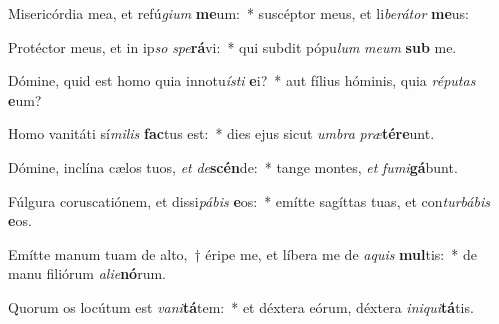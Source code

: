 \item Misericórdia mea, et refú\textit{gi}\textit{um} \textbf{me}um:~* suscéptor meus, et li\textit{be}\textit{rá}\textit{tor} \textbf{me}us:
\item Protéctor meus, et in ip\textit{so} \textit{spe}\textbf{rá}vi:~* qui subdit pópu\textit{lum} \textit{me}\textit{um} \textbf{sub} me.
\item Dómine, quid est homo quia innotu\textit{ís}\textit{ti} \textbf{e}i?~* aut fílius hóminis, quia \textit{ré}\textit{pu}\textit{tas} \textbf{e}um?
\item Homo vanitáti sí\textit{mi}\textit{lis} \textbf{fac}tus est:~* dies ejus sicut \textit{um}\textit{bra} \textit{præ}\textbf{tér}\textbf{e}unt.
\item Dómine, inclína cælos tuos, \textit{et} \textit{de}\textbf{scén}de:~* tange montes, \textit{et} \textit{fu}\textit{mi}\textbf{gá}bunt.
\item Fúlgura coruscatiónem, et dissi\textit{pá}\textit{bis} \textbf{e}os:~* emítte sagíttas tuas, et con\textit{tur}\textit{bá}\textit{bis} \textbf{e}os.
\item Emítte manum tuam de alto,~† éripe me, et líbera me de \textit{a}\textit{quis} \textbf{mul}tis:~* de manu filiórum \textit{a}\textit{li}\textit{e}\textbf{nó}rum.
\item Quorum os locútum est \textit{va}\textit{ni}\textbf{tá}tem:~* et déxtera eórum, déxtera \textit{in}\textit{i}\textit{qui}\textbf{tá}tis.
